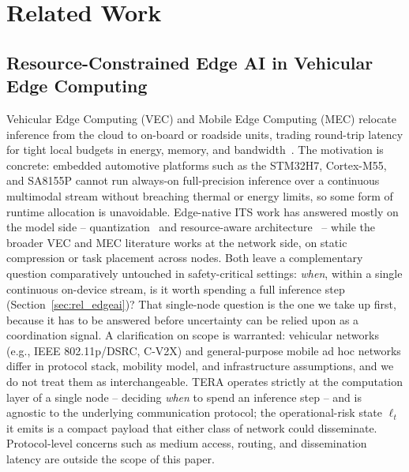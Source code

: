 \documentclass[a4paper,fleqn]{cas-dc}
\begin{document}
\section{Related Work}
\label{sec:relacionados}
\subsection{Resource-Constrained Edge AI in Vehicular Edge Computing}
\label{sec:rel_vec}
Vehicular Edge Computing (VEC) and Mobile Edge Computing (MEC) relocate inference
from the cloud to on-board or roadside units, trading round-trip latency for tight
local budgets in energy, memory, and bandwidth~\cite{gill2025edgeai,bouhsissin2023driver,ortega2020dmd}.
The motivation is concrete: embedded automotive platforms such as the STM32H7,
Cortex-M55, and SA8155P cannot run always-on full-precision inference over a
continuous multimodal stream without breaching thermal or energy limits, so some
form of runtime allocation is unavoidable. Edge-native ITS work has answered mostly
on the model side -- quantization~\cite{hariharan2023driveredge} and resource-aware
architecture~\cite{almodhwahi2025facial} -- while the broader VEC and MEC literature
works at the network side, on static compression or task placement across nodes.
Both leave a complementary question comparatively untouched in safety-critical
settings: \emph{when}, within a single continuous on-device stream, is it worth
spending a full inference step (Section~\ref{sec:rel_edgeai})? That single-node
question is the one we take up first, because it has to be answered before
uncertainty can be relied upon as a coordination signal.
{\color{\revcolor}A clarification on scope is warranted: vehicular networks (e.g.,
IEEE 802.11p/DSRC, C-V2X) and general-purpose mobile ad hoc networks differ in
protocol stack, mobility model, and infrastructure assumptions, and we do not
treat them as interchangeable. TERA operates strictly at the computation layer
of a single node -- deciding \emph{when} to spend an inference step -- and is
agnostic to the underlying communication protocol; the operational-risk state
$\ell_t$ it emits is a compact payload that either class of network could
disseminate. Protocol-level concerns such as medium access, routing, and
dissemination latency are outside the scope of this paper.}
\end{document}
